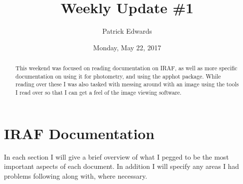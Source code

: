 \documentclass[a4paper]{article}
\title{Weekly Update \#1}
\author{Patrick Edwards}
\begin{document}
\date{Monday, May 22, 2017}
\maketitle

\begin{abstract}
This weekend was focused on reading documentation on IRAF, as well as more specific documentation on using it for photometry, and using the apphot package.  While reading over these I was also tasked with messing around with an image using the tools I read over so that I can get a feel of the image viewing software.
\end{abstract}

\section{IRAF Documentation}
In each section I will give a brief overview of what I pegged to be the most important aspects of each document.  In addition I will specify any areas I had problems following along with, where necessary.
\end{document}
